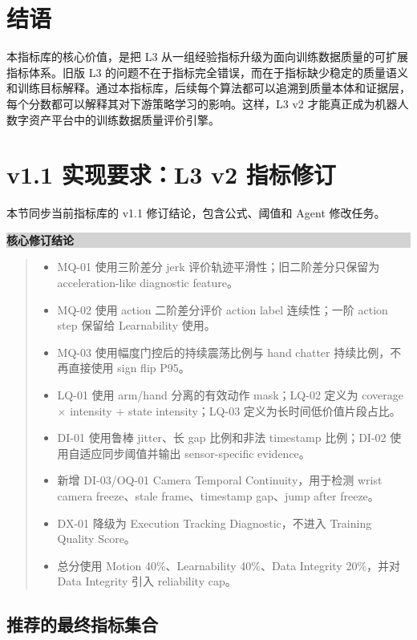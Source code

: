 \documentclass[UTF8,zihao=-4,oneside,openany]{ctexrep}
\newenvironment{decisionbox}[1]{\vspace{0.5em}\noindent\colorbox{LightGray}{\parbox{0.96\linewidth}{\textbf{#1}}}\par\vspace{-0.2em}\begin{quote}\small}{\end{quote}\vspace{0.3em}}
\begin{document}
\section*{结语}

本指标库的核心价值，是把 L3 从一组经验指标升级为面向训练数据质量的可扩展指标体系。旧版 L3 的问题不在于指标完全错误，而在于指标缺少稳定的质量语义和训练目标解释。通过本指标库，后续每个算法都可以追溯到质量本体和证据层，每个分数都可以解释其对下游策略学习的影响。这样，L3 v2 才能真正成为机器人数字资产平台中的训练数据质量评价引擎。


\newpage
\section*{v1.1 实现要求：L3 v2 指标修订}

本节同步当前指标库的 v1.1 修订结论，包含公式、阈值和 Agent 修改任务。

\begin{decisionbox}{核心修订结论}
\begin{itemize}
\item MQ-01 使用三阶差分 jerk 评价轨迹平滑性；旧二阶差分只保留为 acceleration-like diagnostic feature。
\item MQ-02 使用 action 二阶差分评价 action label 连续性；一阶 action step 保留给 Learnability 使用。
\item MQ-03 使用幅度门控后的持续震荡比例与 hand chatter 持续比例，不再直接使用 sign flip P95。
\item LQ-01 使用 arm/hand 分离的有效动作 mask；LQ-02 定义为 coverage \(\times\) intensity + state intensity；LQ-03 定义为长时间低价值片段占比。
\item DI-01 使用鲁棒 jitter、长 gap 比例和非法 timestamp 比例；DI-02 使用自适应同步阈值并输出 sensor-specific evidence。
\item 新增 DI-03/OQ-01 Camera Temporal Continuity，用于检测 wrist camera freeze、stale frame、timestamp gap、jump after freeze。
\item DX-01 降级为 Execution Tracking Diagnostic，不进入 Training Quality Score。
\item 总分使用 Motion 40\%、Learnability 40\%、Data Integrity 20\%，并对 Data Integrity 引入 reliability cap。
\end{itemize}
\end{decisionbox}

\subsection*{推荐的最终指标集合}
\end{document}
